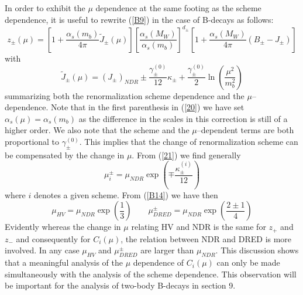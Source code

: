 \documentclass[12pt,rotate]{article}
\begin{document}
\begin{itemize}
\begin{itemize}
In order to exhibit the $\mu$ dependence at the same footing as the
scheme dependence, it is useful to rewrite (\ref{B9}) in the case
of B-decays as follows:
\begin{equation}\label{20}
z_\pm(\mu)=\left[1+\frac{\alpha_s(m_b)}{4\pi} \tilde J_\pm(\mu)\right]
      \left[\frac{\alpha_s(M_W)}{\alpha_s(m_b)}\right]^{d_\pm}
\left[1+\frac{\alpha_s(M_W)}{4\pi}(B_\pm-J_\pm)\right]
\end{equation}
with 
\begin{equation}\label{21}
\tilde J_\pm(\mu)=(J_\pm)_{NDR}\pm 
\frac{\gamma^{(0)}_\pm}{12}\kappa_\pm
+\frac{\gamma^{(0)}_\pm}{2}\ln(\frac{\mu^2}{m^2_b})
\end{equation}
summarizing both the renormalization scheme dependence and the 
$\mu$--dependence. Note that in the first parenthesis in (\ref{20}) 
we have
set $\alpha_s(\mu)=\alpha_s(m_b)$ as the difference in the
scales in this correction is still of a higher order.
We also note that the scheme and the $\mu$--dependent terms
are both proportional to $\gamma^{(0)}_\pm$. This implies that the
change of renormalization scheme can be compensated by the change
in $\mu$. From (\ref{21}) we find generally
\begin{equation}\label{21a}
\mu_i^\pm=\mu_{NDR}\exp\left(\mp\frac{\kappa_\pm^{(i)}}{12}\right)
\end{equation}
where $i$ denotes a given scheme. From (\ref{B14}) we have then
\begin{equation}\label{22}
\mu_{HV}=\mu_{NDR}\exp\left(\frac{1}{3}\right)
\qquad
\mu_{DRED}^{\pm}=
\mu_{NDR}\exp\left(\frac{2\pm 1}{4}\right)
\end{equation}
Evidently whereas the change in $\mu$ relating HV and NDR is the
same for $z_+$ and $z_-$ and consequently for 
$C_i(\mu)$, the relation between NDR and DRED is more involved. In any
case $\mu_{HV}$ and $\mu_{DRED}^\pm$ are larger than $\mu_{NDR}$. 
This discussion shows that a meaningful analysis of the $\mu$
dependence of $C_i(\mu)$ can only be made simultaneously with the
analysis of the scheme dependence. This observation will be important
for the analysis of two-body B-decays in section 9.


\end{itemize}
\end{itemize}
\end{document}
